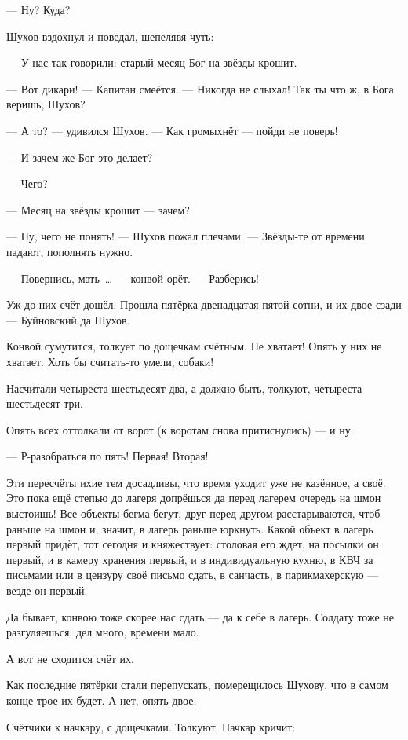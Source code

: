 --- Ну? Куда?

Шухов вздохнул и поведал, шепелявя чуть:

--- У нас так говорили: старый месяц Бог на звёзды крошит.

--- Вот дикари! --- Капитан смеётся. --- Никогда не слыхал! Так ты что ж, в Бога веришь, Шухов?

--- А то? --- удивился Шухов. --- Как громыхнёт --- пойди не поверь!

--- И зачем же Бог это делает?

--- Чего?

--- Месяц на звёзды крошит --- зачем?

--- Ну, чего не понять! --- Шухов пожал плечами. --- Звёзды-те от времени падают, пополнять нужно.

--- Повернись, мать~\dots{} --- конвой орёт. --- Разберись!

Уж до них счёт дошёл. Прошла пятёрка двенадцатая пятой сотни, и их двое сзади --- Буйновский да 
Шухов.

Конвой сумутится, толкует по дощечкам счётным. Не хватает! Опять у них не хватает. Хоть бы 
считать-то умели, собаки!

Насчитали четыреста шестьдесят два, а должно быть, толкуют, четыреста шестьдесят три.

Опять всех оттолкали от ворот (к воротам снова притиснулись) --- и ну:

--- Р-разобраться по пять! Первая! Вторая!

Эти пересчёты ихие тем досадливы, что время уходит уже не казённое, а своё. Это пока ещё 
степью до лагеря допрёшься да перед лагерем очередь на шмон выстоишь! Все объекты бегма 
бегут, друг перед другом расстарываются, чтоб раньше на шмон и, значит, в лагерь раньше 
юркнуть. Какой объект в лагерь первый придёт, тот сегодня и княжествует: столовая его ждет, 
на посылки он первый, и в камеру хранения первый, и в индивидуальную кухню, в КВЧ за письмами 
или в цензуру своё письмо сдать, в санчасть, в парикмахерскую --- везде он первый.

Да бывает, конвою тоже скорее нас сдать --- да к себе в лагерь. Солдату тоже не разгуляешься: 
дел много, времени мало.

А вот не сходится счёт их.

Как последние пятёрки стали перепускать, померещилось Шухову, что в самом конце трое их 
будет. А нет, опять двое.

Счётчики к начкару, с дощечками. Толкуют. Начкар кричит:

